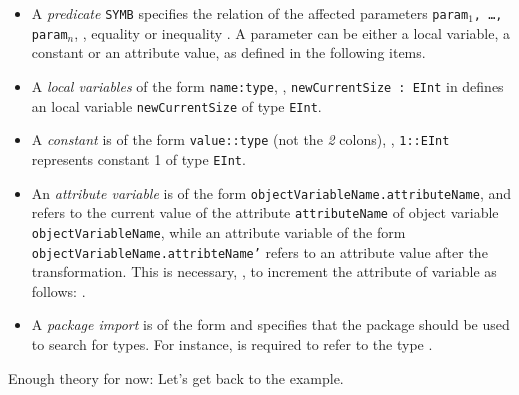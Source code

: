 \begin{itemize}
\item A \emph{predicate} \texttt{SYMB} specifies the relation of the affected parameters \texttt{param$_1$, \ldots, param$_n$}, \eg, equality \entity{=} or inequality \entity{!=}.
A parameter can be either a local variable, a constant or an attribute value, as defined in the following items.
    
\item A \emph{local variables} of the form \texttt{name:type}, \eg, \texttt{newCurrentSize : EInt} in  defines an local variable \texttt{newCurrentSize} of type \texttt{EInt}. 

\item A \emph{constant} is of the form \texttt{value::type} (not the \emph{2} colons), \eg, \texttt{1::EInt} represents constant 1 of type \texttt{EInt}.

\item An \emph{attribute variable} is of the form \texttt{object\-Variable\-Name.attribute\-Name}, and refers to the current value of the attribute \texttt{attributeName} of object variable 	\texttt{object\-Variable\-Name}, while an attribute variable of the form \texttt{object\-Variable\-Name\-.attribte\-Name'} refers to an attribute value after the transformation.
This is necessary, \eg, to increment the attribute  of variable  as follows: . 

\item A \emph{package import} is of the form  and specifies that the package  should be used to search for types.
For instance,  is required to refer to the type . 
\end{itemize}
%
Enough theory for now:
Let's get back to the example.

